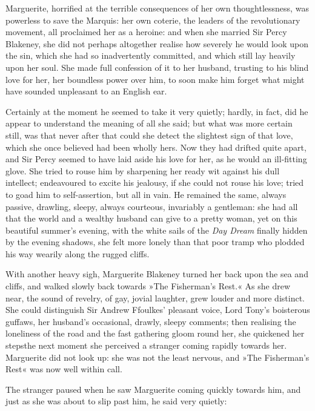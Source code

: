 Marguerite, horrified at the terrible consequences of her own thoughtlessness, was powerless to save the Marquis: her own coterie, the leaders of the revolutionary movement, all proclaimed her as a heroine: and when she married Sir Percy Blakeney, she did not perhaps altogether realise how severely he would look upon the sin, which she had so inadvertently committed, and which still lay heavily upon her soul. She made full confession of it to her husband, trusting to his blind love for her, her boundless power over him, to soon make him forget what might have sounded unpleasant to an English ear.

Certainly at the moment he seemed to take it very quietly; hardly, in fact, did he appear to understand the meaning of all she said; but what was more certain still, was that never after that could she detect the slightest sign of that love, which she once believed had been wholly hers. Now they had drifted quite apart, and Sir Percy seemed to have laid aside his love for her, as he would an ill-fitting glove. She tried to rouse him by sharpening her ready wit against his dull intellect; endeavoured to excite his jealousy, if she could not rouse his love; tried to goad him to self-assertion, but all in vain. He remained the same, always passive, drawling, sleepy, always courteous, invariably a gentleman: she had all that the world and a wealthy husband can give to a pretty woman, yet on this beautiful summer's evening, with the white sails of the \textit{Day Dream} finally hidden by the evening shadows, she felt more lonely than that poor tramp who plodded his way wearily along the rugged cliffs.

With another heavy sigh, Marguerite Blakeney turned her back upon the sea and cliffs, and walked slowly back towards »The Fisherman's Rest.« As she drew near, the sound of revelry, of gay, jovial laughter, grew louder and more distinct. She could distinguish Sir Andrew Ffoulkes' pleasant voice, Lord Tony's boisterous guffaws, her husband's occasional, drawly, sleepy comments; then realising the loneliness of the road and the fast gathering gloom round her, she quickened her steps\textellipsis \allowbreak  the next moment she perceived a stranger coming rapidly towards her. Marguerite did not look up: she was not the least nervous, and »The Fisherman's Rest« was now well within call.

The stranger paused when he saw Marguerite coming quickly towards him, and just as she was about to slip past him, he said very quietly:

